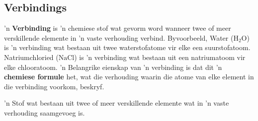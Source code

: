       \label{m38708*uid26}
            \subsection*{Verbindings}
            \nopagebreak
        \label{m38708*id63363} 'n \textbf{Verbinding} is 'n chemiese stof wat gevorm word wanneer twee of meer verskillende elemente in 'n vaste verhouding verbind. Byvoorbeeld, Water ($\text{H}{}_{2}\text{O}$) is 'n verbinding wat bestaan uit twee waterstofatome vir elke een suurstofatoom. Natriumchloried ($\text{NaCl}$) is 'n verbinding wat bestaan uit een natriumatoom vir elke chlooratoom. 'n Belangrike eienskap van 'n verbinding is dat dit 'n \textbf{chemiese formule} het, wat die verhouding waarin die atome van elke element in die verbinding voorkom, beskryf.\par 
\label{m38708*fhsst!!!underscore!!!id201}
 { \label{m38708*meaningfhsst!!!underscore!!!id201}
        'n Stof wat bestaan uit twee of meer verskillende elemente wat in 'n vaste verhouding saamgevoeg is.
         } 


